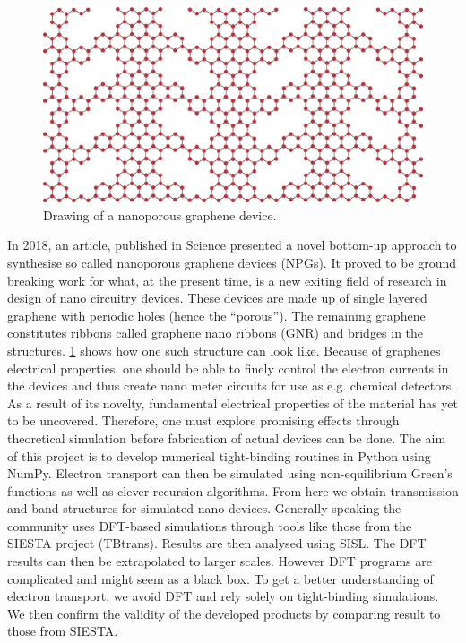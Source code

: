 \begin{figure}
	\vspace{-1em}
	\centering
	\includegraphics[width=.4\textwidth]{Figures/NPGintroGraphic.eps}
	\caption{Drawing of a nanoporous graphene device.}\label{introGraphic}
\end{figure}
In 2018, an article\cite{Moreno199}, published in Science presented a novel bottom-up approach to synthesise so called nanoporous graphene devices (NPGs). It proved to be ground breaking work for what, at the present time, is a new exiting field of research in design of nano circuitry devices. These devices are made up of single layered graphene with periodic holes (hence the ``porous''). The remaining graphene constitutes ribbons called graphene nano ribbons (GNR) and bridges in the structures. \cref{introGraphic} shows how one such structure can look like.
Because of graphenes electrical properties\cite{calogero_electron_2019}, one should be able to finely control the electron currents in the devices and thus create nano meter circuits for use as e.g. chemical detectors. As a result of its novelty, fundamental electrical properties of the material has yet to be uncovered. Therefore, one must explore promising effects through theoretical simulation before fabrication of actual devices can be done.\newline
The aim of this project is to develop numerical tight-binding routines in Python using NumPy. Electron transport can then be simulated using non-equilibrium Green's functions as well as clever recursion algorithms. From here we obtain transmission and band structures for simulated nano devices.\newline
Generally speaking the community uses DFT-based simulations through tools like those from the SIESTA\cite{Soler_2002} project (TBtrans). Results are then analysed using SISL\cite{zerothi_sisl}. The DFT results can then be extrapolated to larger scales\cite{calogero_electron_2019}. However DFT programs are complicated and might seem as a black box. To get a better understanding of electron transport, we avoid DFT and rely solely on tight-binding simulations. We then confirm the validity of the developed products by comparing result to those from SIESTA.\newline
